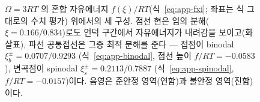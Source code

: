 \documentclass[11pt,a4paper]{article}
\begin{document}
\begin{figure}[t]
\caption{$\Omega=3RT$ 의 혼합 자유에너지 $f(\xi)/RT$(식~\eqref{eq:app-fxi}; 좌표는 식 그대로의
수치 평가) 위에서의 세 구성. 점선 현은 임의 분해($\xi=0.166/0.834$)로도 언덕 구간에서 자유에너지가
내려감을 보이고(화살표), 파선 공통접선은 그중 최적 분해를 준다 --- 접점이 binodal
$\xi_b^\pm=0.0707/0.9293$ (식~\eqref{eq:app-binodal}, 접선 높이 $f/RT=-0.0583$), 변곡점이 spinodal
$\xi_s^\pm=0.2113/0.7887$ (식~\eqref{eq:app-spinodal}, $f/RT=-0.0157$)이다. 음영은 준안정
영역(연함)과 불안정 영역(진함)이다.}
\label{fig:app-tangent}
\end{figure}
\end{document}
